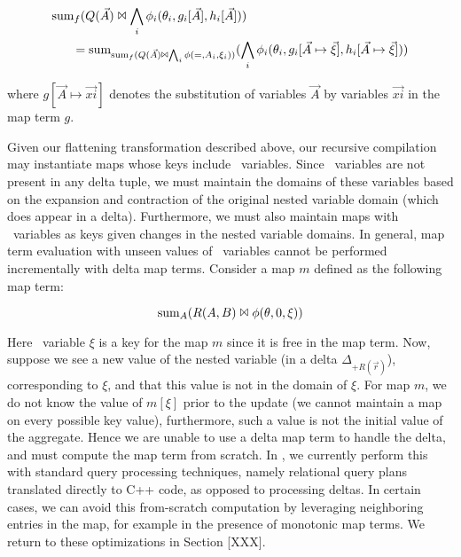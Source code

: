 \begin{align*}
\mathrm{sum}_{f}( & Q(\vec{A}) \Join \bigwedge_i \phi_i(\theta_i, g_i[\vec{A}], h_i[\vec{A}])) \\
= & \; \mathrm{sum}_{\mathrm{sum}_{f}(Q(\vec{A}) \Join \bigwedge_i \phi(=,A_i,\xi_i))}(
\bigwedge_i \phi_i(\theta_i, g_i[\vec{A} \mapsto \vec{\xi}], h_i[\vec{A} \mapsto \vec{\xi}]))
\end{align*}

\noindent where $g[\vec{A} \mapsto \vec{xi}]$ denotes the substitution of
variables $\vec{A}$ by variables $\vec{xi}$ in the map term $g$.

Given our flattening transformation described above, our recursive compilation
may instantiate maps whose keys include \bigsum\ variables. Since \bigsum\
variables are not present in any delta tuple, we must maintain the domains of
these variables based on the expansion and contraction of the original nested
variable domain (which does appear in a delta). Furthermore, we must also
maintain maps with \bigsum\ variables as keys given changes in the nested
variable domains. In general, map term evaluation with unseen values of \bigsum\
variables cannot be performed incrementally with delta map terms. Consider a map
$m$ defined as the following map term:

\[\mathrm{sum}_{A}(R(A,B)\Join \phi(\theta, 0, \xi))\]


Here \bigsum\ variable $\xi$ is a key for the map $m$ since it is free in the
map term.
Now, suppose we see a new value of the nested variable (in a delta
$\Delta_{+R(\vec{r})}$), corresponding to $\xi$, and that this value is not in
the domain of $\xi$. For map $m$, we do not know the value of $m[\xi]$ prior to
the update (we cannot maintain a map on every possible key value), furthermore,
such a value is not the initial value of the aggregate. Hence we are unable to
use a delta map term to handle the delta, and must compute the map term from
scratch. In \compiler, we currently perform this with standard query processing
techniques, namely relational query plans translated directly to C++ code, as
opposed to processing deltas. In certain cases, we can avoid this from-scratch
computation by leveraging neighboring entries in the map, for example in the
presence of monotonic map terms. We return to these optimizations in Section
[XXX].


